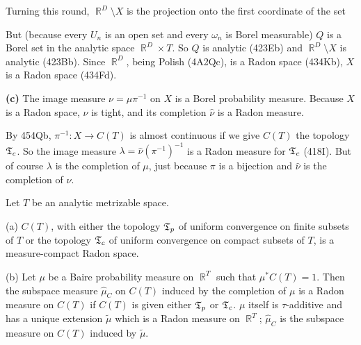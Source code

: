 {\noindent Turning this round, $\BbbR^D\setminus X$ is the projection
onto the first coordinate of the set


\noindent But (because every $U_n$ is an open set and every $\omega_n$
is Borel measurable) $Q$ is a Borel set in the
analytic space $\BbbR^D\times T$.   So $Q$ is analytic (423Eb) and
$\BbbR^D\setminus X$ is analytic (423Bb).   Since $\BbbR^D$, being
Polish (4A2Qc), is a Radon space (434Kb), $X$ is a Radon space (434Fd).

\medskip

{\bf (c)} The image measure $\nu=\mu\pi^{-1}$ on $X$ is a Borel
probability measure.   Because $X$ is a Radon space, $\nu$ is tight, and
its completion $\hat\nu$
is a Radon measure.

By 454Qb, $\pi^{-1}:X\to C(T)$ is almost continuous if we give $C(T)$
the topology $\frak T_c$.   So the image measure
$\lambda=\hat\nu(\pi^{-1})^{-1}$ is a Radon measure for $\frak T_c$
(418I).   But of course $\lambda$ is the completion of $\mu$, just
because $\pi$ is a bijection and $\hat\nu$ is the completion of $\nu$.
}%

 Let
$T$ be an analytic metrizable space.

(a) $C(T)$, with either the topology $\frak T_p$ of uniform convergence
on finite subsets of $T$ or the topology $\frak T_c$ of uniform
convergence on compact subsets of $T$, is a measure-compact Radon space.

(b) Let $\mu$ be a Baire probability measure on $\BbbR^T$ such that
$\mu^*C(T)=1$.   Then the subspace measure $\hat\mu_C$ on $C(T)$ induced by
the completion of $\mu$ is a Radon measure on $C(T)$ if $C(T)$ is given
either $\frak T_p$ or $\frak T_c$.
$\mu$ itself is $\tau$-additive and has a unique
extension $\tilde\mu$ which is a Radon measure on $\BbbR^T$;
$\hat\mu_C$ is the subspace measure on $C(T)$ induced by
$\tilde\mu$.

